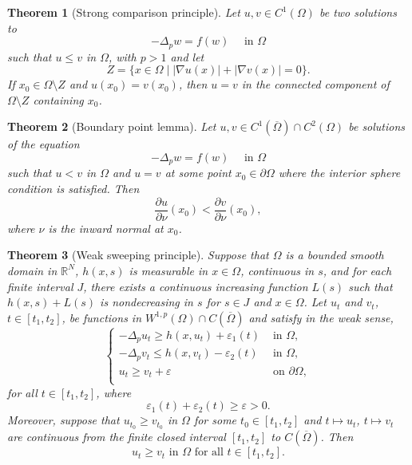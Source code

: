 \documentclass[10pt,a4paper]{amsart}
\newtheorem{theorem}{Theorem}
\begin{document}
	\begin{theorem}[Strong comparison principle]\label{th:scp}
		Let $u,v\in C^1(\Omega)$ be two solutions to
		\[
		-\Delta_p w = f(w) \quad\text{ in } \Omega
		\]
		such that $u \le v$ in $\Omega$, with $p>1$ and let
		\[
		Z=\{x\in\Omega \mid |\nabla u(x)|+|\nabla v(x)|=0\}.
		\]
		If $x_0\in\Omega\setminus Z$ and $u(x_0)=v(x_0)$, then $u=v$ in the connected component of $\Omega\setminus Z$ containing $x_0$.
	\end{theorem}

	\begin{theorem}[Boundary point lemma]\label{lem:bpm}
		Let $u,v\in C^1(\overline{\Omega})\cap C^2(\Omega)$ be solutions of the equation
		\[
		-\Delta_p w = f(w) \quad\text{ in }\Omega
		\]
		such that $u<v$ in $\Omega$ and $u=v$ at some point $x_0 \in \partial \Omega$ where the interior sphere condition is satisfied. Then
		\[
		\frac{\partial u}{\partial \nu}(x_0)<\frac{\partial v}{\partial \nu}(x_0),
		\]
		where $\nu$ is the inward normal at $x_0$.
	\end{theorem}

	\begin{theorem}[Weak sweeping principle]\label{th:wsp}
		Suppose that $\Omega$ is a bounded smooth domain in $\mathbb{R}^N$, $h(x, s)$ is measurable in $x \in \Omega$,
		continuous in $s$, and for each finite interval $J$, there exists a continuous increasing function $L(s)$ such
		that $h(x, s) + L(s)$ is nondecreasing in $s$ for $s \in J$ and $x \in \Omega$. Let $u_t$ and $v_t$, $t \in [t_1, t_2]$, be functions in $W^{1,p}(\Omega) \cap C(\overline \Omega)$ and satisfy in the weak sense,
		\[
		\begin{cases}
			-\Delta_p u_t \ge h(x,u_t) + \varepsilon_1(t) & \text{ in } \Omega,\\
			-\Delta_p v_t \le h(x,v_t) - \varepsilon_2(t) & \text{ in } \Omega,\\
			u_t \ge v_t + \varepsilon & \text{ on } \partial\Omega,\\
		\end{cases}
		\]
		for all $t \in [t_1, t_2]$, where
		\[
		\varepsilon_1(t) + \varepsilon_2(t) \ge \varepsilon > 0.
		\]
		Moreover, suppose that $u_{t_0} \ge v_{t_0}$ in $\Omega$ for some $t_0 \in [t_1, t_2]$ and $t \mapsto u_t$, $t \mapsto v_t$ are continuous from the finite closed interval $[t_1, t_2]$ to $C(\overline \Omega)$. Then
		\[
		u_t \ge v_t \text{ in } \Omega \text{ for all } t \in [t_1, t_2].
		\]
	\end{theorem}
\end{document}

